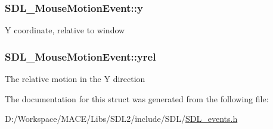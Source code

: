 \subsubsection[{\texorpdfstring{y}{y}}]{ S\+D\+L\+\_\+\+Mouse\+Motion\+Event\+::y}\hypertarget{struct_s_d_l___mouse_motion_event_a7e6a7b1f8713d1968dc913908e8ea448}{}\label{struct_s_d_l___mouse_motion_event_a7e6a7b1f8713d1968dc913908e8ea448}
Y coordinate, relative to window 
\subsubsection[{\texorpdfstring{yrel}{yrel}}]{ S\+D\+L\+\_\+\+Mouse\+Motion\+Event\+::yrel}\hypertarget{struct_s_d_l___mouse_motion_event_a7674c8b92d039ab948f671a180fa7b30}{}\label{struct_s_d_l___mouse_motion_event_a7674c8b92d039ab948f671a180fa7b30}
The relative motion in the Y direction 

The documentation for this struct was generated from the following file\+:\begin{DoxyCompactItemize}
\item 
D\+:/\+Workspace/\+M\+A\+C\+E/\+Libs/\+S\+D\+L2/include/\+S\+D\+L/\hyperlink{_s_d_l__events_8h}{S\+D\+L\+\_\+events.\+h}\end{DoxyCompactItemize}
